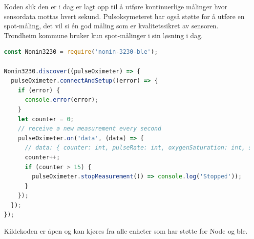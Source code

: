 Koden slik den er i dag er lagt opp til å utføre kontinuerlige målinger hvor sensordata mottas hvert sekund. Pulsoksymeteret
har også støtte for å utføre en spot-måling, det vil si én god måling som er kvalitetssikret av sensoren. Trondheim kommune
bruker kun spot-målinger i sin løsning i dag.

\begin{minipage}{\linewidth}
\begin{lstlisting}[frame=single, language=JavaScript,
    caption=Bruk av nonin-3230-ble, label=lst:nonin-3230-usage]
const Nonin3230 = require('nonin-3230-ble');

Nonin3230.discover((pulseOximeter) => {
  pulseOximeter.connectAndSetup((error) => {
    if (error) {
      console.error(error);
    }
    let counter = 0;
    // receive a new measurement every second
    pulseOximeter.on('data', (data) => {
      // data: { counter: int, pulseRate: int, oxygenSaturation: int, status: object }
      counter++;
      if (counter > 15) {
        pulseOximeter.stopMeasurement(() => console.log('Stopped'));
      }
    });
  });
});
\end{lstlisting}
\end{minipage}

Kildekoden er åpen og kan kjøres fra alle enheter som har støtte for Node og \gls{ble}.


